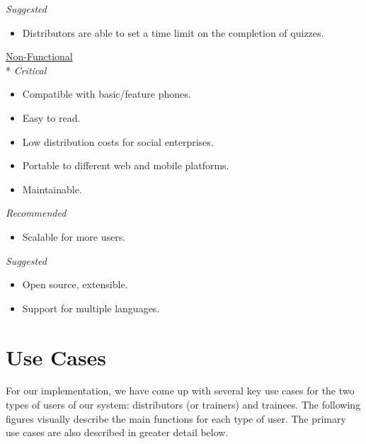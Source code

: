 \textit{Suggested}
\begin{itemize}
\item Distributors are able to set a time limit on the completion of quizzes.\\[-0.5\baselineskip]
\end{itemize}

\underline{Non-Functional}\\*
\textit{Critical}
\begin{itemize}
\item Compatible with basic/feature phones.
\item Easy to read.
\item Low distribution costs for social enterprises.
\item Portable to different web and mobile platforms.
\item Maintainable.
\end{itemize}

\textit{Recommended}
\begin{itemize}
\item Scalable for more users.
\end{itemize}

\textit{Suggested}
\begin{itemize}
\item Open source, extensible.
\item Support for multiple languages.
\end{itemize}

\section{Use Cases}
For our implementation, we have come up with several key use cases for the two types of users of our system: distributors (or trainers) and trainees. The following figures visually describe the main functions for each type of user. The primary use cases are also described in greater detail below.

